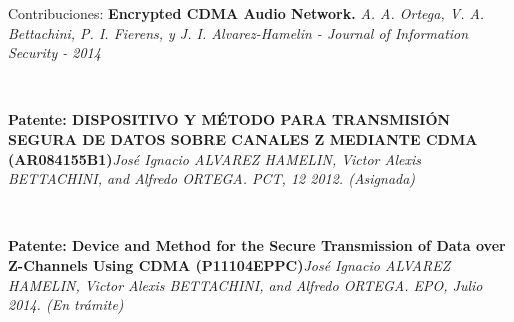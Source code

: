 \documentclass[aspectratio=169]{beamer}
\begin{document}
\begin{frame}{Contribuciones:}
\textbf{Encrypted CDMA Audio Network.} \textit{ A. A. Ortega, V. A. Bettachini, P. I. Fierens, y J. I. Alvarez-Hamelin -  Journal of Information Security - 2014}

\

\textbf{Patente: DISPOSITIVO Y MÉTODO PARA TRANSMISIÓN SEGURA DE DATOS SOBRE CANALES Z MEDIANTE CDMA (AR084155B1)}\textit{José Ignacio ALVAREZ HAMELIN, Victor Alexis BETTACHINI, and Alfredo ORTEGA. PCT, 12 2012. (Asignada)}

\

\textbf{Patente: Device and Method for the Secure Transmission of Data over Z-Channels Using CDMA (P11104EPPC)}\textit{José Ignacio ALVAREZ HAMELIN, Victor Alexis BETTACHINI, and Alfredo ORTEGA. EPO, Julio 2014. (En trámite)}

\
\end{frame}


\footnotesize
\end{document}
